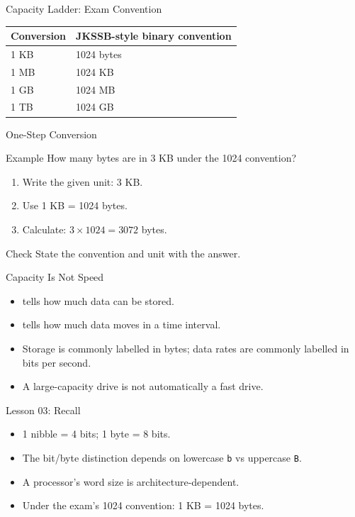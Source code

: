 \documentclass[aspectratio=169]{beamer}
\begin{document}
\begin{frame}{Capacity Ladder: Exam Convention}
  \begin{center}
    \begin{tabular}{ll}
      \toprule
      \textbf{Conversion} & \textbf{JKSSB-style binary convention} \\
      \midrule
      1 KB & 1024 bytes \\
      1 MB & 1024 KB \\
      1 GB & 1024 MB \\
      1 TB & 1024 GB \\
      \bottomrule
    \end{tabular}
  \end{center}
  \vspace{0.25cm}
\end{frame}

\begin{frame}{One-Step Conversion}
  \begin{exampleblock}{Example}
    How many bytes are in 3 KB under the 1024 convention?
  \end{exampleblock}
  \begin{enumerate}
    \item Write the given unit: 3 KB.
    \item Use 1 KB = 1024 bytes.
    \item Calculate: $3 \times 1024 = 3072$ bytes.
  \end{enumerate}
  \begin{alertblock}{Check}
    State the convention and unit with the answer.
  \end{alertblock}
\end{frame}

\begin{frame}{Capacity Is Not Speed}
  \begin{itemize}
    \item {} tells how much data can be stored.
    \item {} tells how much data moves in a time interval.
    \item Storage is commonly labelled in bytes; data rates are commonly
      labelled in bits per second.
    \item A large-capacity drive is not automatically a fast drive.
  \end{itemize}
\end{frame}

\begin{frame}{Lesson 03: Recall}
  \begin{itemize}
    \item 1 nibble = 4 bits; 1 byte = 8 bits.
    \item The bit/byte distinction depends on lowercase \texttt{b} vs
      uppercase \texttt{B}.
    \item A processor's word size is architecture-dependent.
    \item Under the exam's 1024 convention: 1 KB = 1024 bytes.
  \end{itemize}
\end{frame}
\end{document}
